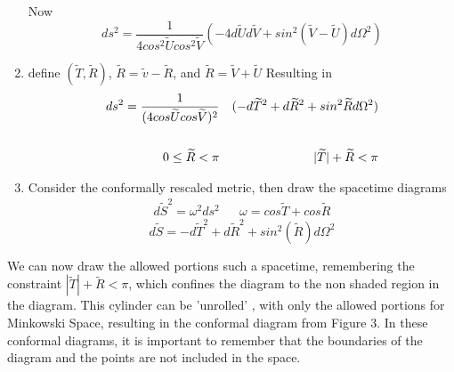 \documentclass[10pt]{article}
\begin{document}
\begin{enumerate}
               	Now
               	\begin{equation}
               	    ds^2=\frac{1}{4cos^2\widetilde{U}cos^2\widetilde{V}}(-4d\widetilde{U}d\widetilde{V}+sin^2(\widetilde{V}-\widetilde{U})d\Omega^2)
               	\end{equation}
               	
               	\item define \((\widetilde{T},\widetilde{R})\), \(\widetilde{R}=\widetilde{v}-\widetilde{R}\), and \(\widetilde{R}=\widetilde{V}+\widetilde{U}\)
               	Resulting in 
               	\begin{equation}
               	 \begin{align} ds^2=\frac{1}{(4cos\widetilde{U}cos\widetilde{V})^2}&&(-d\widetilde{T}^2+d\widetilde{R}^2+sin^2\widetilde{R}d\Omega^2)\\
               	 \newline\\
               	  0\leq{\widetilde{R}}<\pi && |\widetilde{T}|+\widetilde{R}<\pi
               	  \end{align}
               	\end{equation}
               	\item Consider the conformally rescaled metric, then draw the spacetime diagrams
               	\begin{equation}
               	   \begin{align} d\widetilde{S}^2=\omega^2ds^2 &&  \omega=cos\widetilde{T}+cos\widetilde{R}
               	   \end{align}
               	\end{equation}
               	\begin{equation}
               	    d\widetilde{S}=-d\widetilde{T}^2+d\widetilde{R}^2+sin^2(\widetilde{R})d\Omega^2
               	\end{equation}

             \end{enumerate}
             We can now draw the allowed portions such a spacetime, remembering the constraint $|\widetilde{T}|+\widetilde{R}<\pi$, which confines the diagram to the non shaded region in the diagram. This cylinder can be 'unrolled' , with only the allowed portions for Minkowski Space, resulting in the conformal diagram from Figure 3. In these conformal diagrams, it is important to remember that the boundaries of the diagram and the points are not included in the space.
\end{document}
